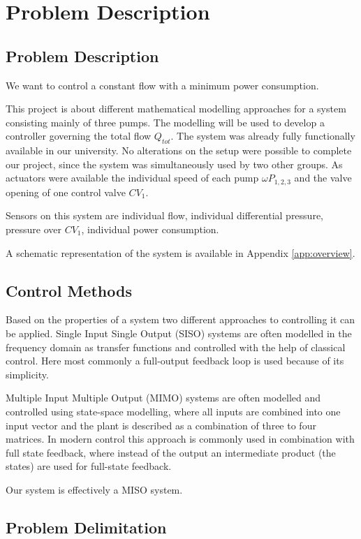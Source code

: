 \chapter{Problem Description}\label{ch:probdesc}

\section{Problem Description}
We want to control a constant flow with a minimum power consumption.

This project is about different mathematical modelling approaches for a system consisting mainly of three pumps.
The modelling will be used to develop a controller governing the total flow $Q_{tot}$.
The system was already fully functionally available in our university.
No alterations on the setup were possible to complete our project,
since the system was simultaneously used by two other groups.
As actuators were available the individual speed of each pump $\omega P_{1,2,3}$ and the valve opening of one control valve $CV_1$.

Sensors on this system are individual flow, individual differential pressure, pressure over $CV_1$, individual power consumption.

A schematic representation of the system is available in Appendix \ref{app:overview}.


\section{Control Methods}
Based on the properties of a system two different approaches to controlling it can be applied.
Single Input Single Output (SISO) systems are often modelled in the frequency domain
as transfer functions and controlled with the help of classical control.
Here most commonly a full-output feedback loop is used because of its simplicity.
\cite{Franklin2014}

Multiple Input Multiple Output (MIMO) systems are often modelled and controlled using state-space
modelling, where all inputs are combined into one input vector
and the plant is described as a combination of three to four matrices.
In modern control this approach is commonly used in combination with full state feedback,
where instead of the output an intermediate product (the states) are used for full-state feedback.

Our system is effectively a MISO system.





\section{Problem Delimitation}
